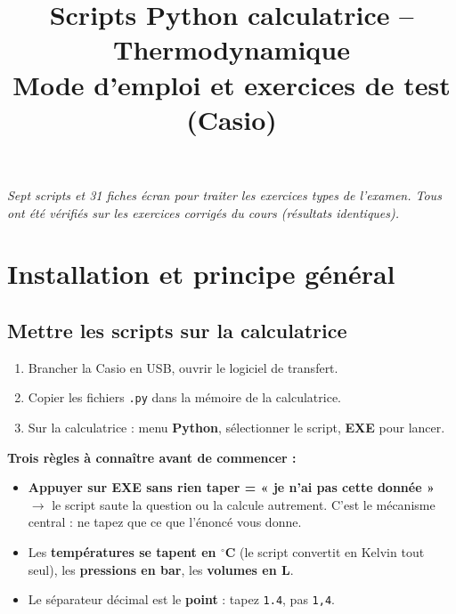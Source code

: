 \documentclass[10.5pt,a4paper]{article}
\title{\textbf{Scripts Python calculatrice -- Thermodynamique}\\[3pt]
\large Mode d'emploi et exercices de test (Casio)}
\author{}
\date{}
\begin{document}
\maketitle
\vspace{-0.9cm}
\begin{center}
\small\itshape Sept scripts et 31 fiches écran pour traiter les exercices types de l'examen. Tous ont été vérifiés sur les
exercices corrigés du cours (résultats identiques).
\end{center}
\vspace{0.3cm}

\section{Installation et principe général}

\subsection*{Mettre les scripts sur la calculatrice}
\begin{enumerate}[leftmargin=1.5em]
\item Brancher la Casio en USB, ouvrir le logiciel de transfert.
\item Copier les fichiers \texttt{.py} dans la mémoire de la calculatrice.
\item Sur la calculatrice : menu \textbf{Python}, sélectionner le script, \textbf{EXE} pour lancer.
\end{enumerate}

\begin{piege}
\textbf{Trois règles à connaître avant de commencer :}
\begin{itemize}[leftmargin=1.3em,nosep]
\item \textbf{Appuyer sur EXE sans rien taper = « je n'ai pas cette donnée »} $\rightarrow$ le script
saute la question ou la calcule autrement. C'est le mécanisme central : ne tapez que ce que l'énoncé
vous donne.
\item Les \textbf{températures se tapent en $^\circ$C} (le script convertit en Kelvin tout seul), les
\textbf{pressions en bar}, les \textbf{volumes en L}.
\item Le séparateur décimal est le \textbf{point} : tapez \texttt{1.4}, pas \texttt{1,4}.
\end{itemize}
\end{piege}
\end{document}
